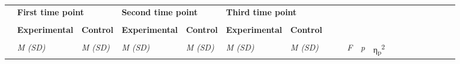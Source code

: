 \documentclass[authordate, empirical]{jote-new-article}
\begin{document}
\begin{table}
  \begin{tabularx}{\linewidth}{@{} l l l l l l l l l l l l l l  l l l l l l @{}}
    \hline                                         & \multicolumn{2}{l}{\textbf{First time point}} &
    \multicolumn{2}{l}{\textbf{Second time point}} &
    \multicolumn{2}{l}{\textbf{Third time point}}  &                                               &                      &                                   &                                   &                                                                                          \\

                                                   & \multicolumn{2}{l}{}                          & \multicolumn{2}{l}{} & \multicolumn{2}{l}{}              &                                   &                                   &                                       &

                                                   &                                                                                                                                                                                                                                         \\

                                                   & \textbf{Experimental }                        & \textbf{Control }    & \textbf{Experimental }            &
    \textbf{Control }                              & \textbf{Experimental }                        & \textbf{Control }    &                                   &                                   &                                   &
                                                   &                                                                                                                                                                                                                                         \\

    \hline                                         &                                               &                      &                                   &                                   &                                   &                                       &   &  &  &  & \\

                                                   & \emph{M (SD)}                                 & \emph{M (SD)}        & \emph{M (SD)}                     & \emph{M (SD)}                     & \emph{M (SD)}
                                                   & \emph{M (SD)}                                 &                      &                                   & \emph{F}                          & \emph{p}                          & η\textsubscript{p}\textsuperscript{2}
    \\


\end{tabularx}
\end{table}
\end{document}
